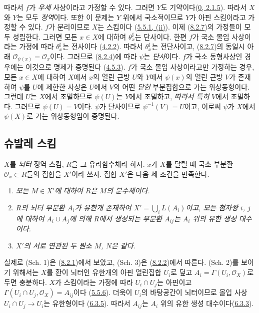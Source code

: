 따라서 $f$가 \emph{우세} 사상이라고 가정할 수 있다. 그러면 $Y$도
기약이다(\hyperref[0.2.1.5-ko]{0, 2.1.5}). 따라서 $X$와 $Y$는 모두
\emph{정역}이다. 또한 이 문제는 $Y$ 위에서 국소적이므로 $Y$가 아핀
스킴이라고 가정할 수 있다. $f$가 분리이므로 $X$는 스킴이다
(\hyperref[I.5.5.1-ko]{5.5.1, (ii)}). 이제
(\hyperref[I.8.2.7-ko]{8.2.7})의 가정들이 모두 성립한다. 그러면 모든
$x\in X$에 대하여 $\theta_x^\sharp$는 단사이다. 한편 $f$가 국소
몰입 사상이라는 가정에 따라 $\theta_x^\sharp$는 전사이다
(\hyperref[I.4.2.2-ko]{4.2.2}). 따라서 $\theta_x^\sharp$는
전단사이고, (\hyperref[I.8.2.7-ko]{8.2.7})의 동일시 아래
$\mathscr{O}_{\psi(x)}=\mathscr{O}_x$이다. 그러므로
(\hyperref[I.8.2.4-ko]{8.2.4})에 따라 $\psi$는 \emph{단사}이다. $f$가 국소
동형사상인 경우에는 이것으로 명제가 증명된다
(\hyperref[I.4.5.3-ko]{4.5.3}). $f$가 국소 몰입 사상이라고만
가정하는 경우, 모든 $x\in X$에 대하여 $X$에서 $x$의 열린 근방
$U$와 $Y$에서 $\psi(x)$의 열린 근방 $V$가 존재하여 $\psi$를 $U$에
제한한 사상은 $U$에서 $V$의 어떤 \emph{닫힌} 부분집합으로 가는
위상동형이다. 그런데 $U$는 $X$에서 조밀하므로 $\psi(U)$는 $Y$에서
조밀하고, \emph{따라서 특히} $V$에서 조밀하다. 그러므로
$\psi(U)=V$이다. $\psi$가 단사이므로 $\psi^{-1}(V)=U$이고, 이로써
$\psi$가 $X$에서 $\psi(X)$로 가는 위상동형임이 증명된다.

\subsection{슈발레 스킴}
\label{subsection:I.8.3-ko}

\begin{env}[8.3.1]
\label{I.8.3.1-ko}
$X$를 \emph{뇌터} 정역 스킴, $R$을 그 유리함수체라 하자. $x$가 $X$를
달릴 때 국소 부분환 $\mathscr{O}_x\subset R$들의 집합을
$X'$이라 쓰자. 집합 $X'$은 다음 세 조건을 만족한다.
\begin{enumerate}
  \item[(Sch. 1)] \emph{모든 $M\in X'$에 대하여 $R$은 $M$의
    분수체이다.}
  \item[(Sch. 2)] \emph{$R$의 뇌터 부분환 $A_i$가 유한개 존재하여
    $X'=\bigcup_i L(A_i)$이고, 모든 첨자쌍 $i$, $j$에 대하여
    $A_i\cup A_j$에 의해 $R$에서 생성되는 부분환 $A_{ij}$는 $A_i$
    위의 유한 생성 대수이다.}
  \item[(Sch. 3)] \emph{$X'$의 서로 연관된 두 원소 $M$, $N$은
    같다.}
\end{enumerate}
\end{env}

실제로 (Sch. 1)은 (\hyperref[I.8.2.1-ko]{8.2.1})에서 보았고,
(Sch. 3)은 (\hyperref[I.8.2.2-ko]{8.2.2})에서 따른다. (Sch. 2)를
보이기 위해서는 $X$를 환이 뇌터인 유한개의 아핀 열린집합 $U_i$로
덮고 $A_i=\Gamma(U_i,\mathscr{O}_X)$로 두면 충분하다. $X$가 스킴이라는
가정에 따라 $U_i\cap U_j$는 아핀이고
$\Gamma(U_i\cap U_j,\mathscr{O}_X)=A_{ij}$이다
(\hyperref[I.5.5.6-ko]{5.5.6}). 더욱이 $U_i$의 바탕공간이 뇌터이므로
몰입 사상 $U_i\cap U_j\to U_i$는 유한형이다
(\hyperref[I.6.3.5-ko]{6.3.5}). 따라서 $A_{ij}$는 $A_i$ 위의 유한
생성 대수이다(\hyperref[I.6.3.3-ko]{6.3.3}).

